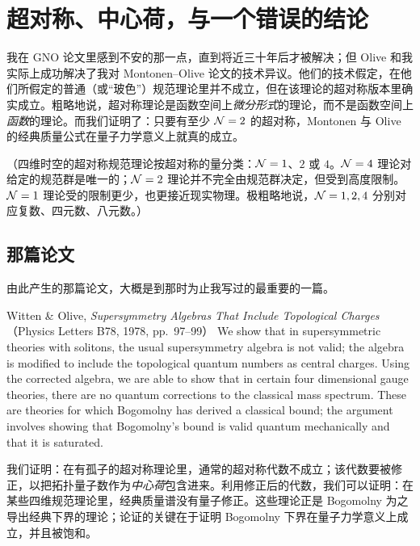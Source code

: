 \section{超对称、中心荷，与一个错误的结论}

\par\medskip

我在 GNO 论文里感到不安的那一点，直到将近三十年后才被解决；但 Olive 和我实际上成功解决了我对 Montonen--Olive 论文的技术异议。他们的技术假定，在他们所假定的普通（或“玻色”）规范理论里并不成立，但在该理论的超对称版本里确实成立。粗略地说，超对称理论是函数空间上\emph{微分形式}的理论，而不是函数空间上\emph{函数}的理论。而我们证明了：只要有至少 $\mathcal{N}=2$ 的超对称，Montonen 与 Olive 的经典质量公式在量子力学意义上就真的成立。

（四维时空的超对称规范理论按超对称的量分类：$\mathcal{N}=1$、$2$ 或 $4$。$\mathcal{N}=4$ 理论对给定的规范群是唯一的；$\mathcal{N}=2$ 理论并不完全由规范群决定，但受到高度限制。$\mathcal{N}=1$ 理论受的限制更少，也更接近现实物理。极粗略地说，$\mathcal{N}=1,2,4$ 分别对应复数、四元数、八元数。）

\subsection{那篇论文}

由此产生的那篇论文，大概是到那时为止我写过的最重要的一篇。

\begin{abstractbox}{Witten \& Olive, \emph{Supersymmetry Algebras That Include Topological Charges}（Physics Letters B78, 1978, pp.~97--99）}
We show that in supersymmetric theories with solitons, the usual supersymmetry algebra is not valid; the algebra is modified to include the topological quantum numbers as central charges. Using the corrected algebra, we are able to show that in certain four dimensional gauge theories, there are no quantum corrections to the classical mass spectrum. These are theories for which Bogomolny has derived a classical bound; the argument involves showing that Bogomolny's bound is valid quantum mechanically and that it is saturated.

\medskip
我们证明：在有孤子的超对称理论里，通常的超对称代数不成立；该代数要被修正，以把拓扑量子数作为\emph{中心荷}包含进来。利用修正后的代数，我们可以证明：在某些四维规范理论里，经典质量谱没有量子修正。这些理论正是 Bogomolny 为之导出经典下界的理论；论证的关键在于证明 Bogomolny 下界在量子力学意义上成立，并且被饱和。
\end{abstractbox}


